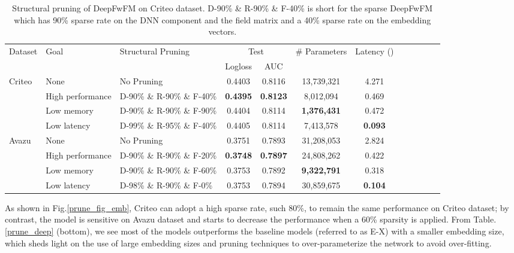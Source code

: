 \documentclass[sigconf]{acmart}
\begin{document}
\begin{table*}
 \caption{Structural pruning of DeepFwFM on Criteo dataset. D-90\% \& R-90\% \& F-40\% is short for the sparse DeepFwFM which has 90\% sparse rate on the DNN component and the field matrix  and a 40\% sparse rate on the embedding vectors.}
  \centering
  \small
  \begin{tabular}{lllccccccrrc}
    \toprule
    \multirow{2}{*}{Dataset}& \multirow{2}{*}{Goal}& \multirow{2}{*}{Structural Pruning}  &  \multicolumn{2}{c}{Test} & \multirow{2}{*}{\# Parameters} & \multirow{2}{*}{Latency ()}  \\
    & &   & Logloss     & AUC & \\
    \midrule
    \multirow{4}{*}{Criteo} & None & No Pruning   &  0.4403  & 0.8116 & 13,739,321 & 4.271 \\
     & High performance & D-90\% \& R-90\% \& F-40\% &  \textbf{0.4395}  & \textbf{{0.8123}}  & 8,012,094 & 0.469 \\
     & Low memory & D-90\% \& R-90\% \& F-90\% &   0.4404  & 0.8114  & \textbf{1,376,431} & 0.472 \\
     & {Low latency} & D-99\% \& R-95\% \& F-40\%  &  0.4405  & 0.8114  &   7,413,578 & \textbf{0.093} \\
    \midrule
    \multirow{4}{*}{Avazu} & None & No Pruning   &   0.3751 & 0.7893   & 31,208,053  & 2.824 \\
    & High performance & D-90\% \& R-90\% \& F-20\%  & \textbf{0.3748}  & \textbf{0.7897}   & 24,808,262  & 0.422  \\
     & Low memory & D-90\% \& R-90\% \& F-60\%  & 0.3753  & 0.7892   &  \textbf{9,322,791} & 0.318  \\
     & Low latency & D-98\% \& R-90\% \& F-0\%  &    0.3753 & 0.7894    & 30,859,675   & \textbf{0.104}
      \\
     \bottomrule
  \end{tabular}
  \label{prune_all_criteo}
\end{table*}

As shown in Fig.\ref{prune_fig_emb}, Criteo can adopt a high sparse rate, such 80\%, to remain the same performance on Criteo dataset; by contrast, the model is sensitive on Avazu dataset and starts to decrease the performance when a 60\% sparsity is applied. From Table. \ref{prune_deep} (bottom), we see most of the models outperforms the baseline models (referred to as E-X) with a smaller embedding size, which sheds light on the use of large embedding sizes and pruning techniques to over-parameterize the network to avoid over-fitting.
\end{document}
